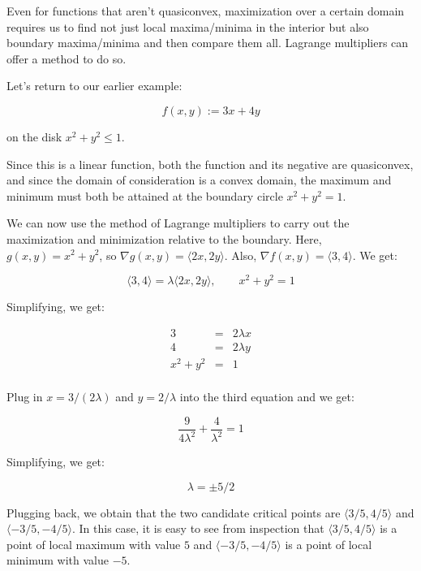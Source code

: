 \documentclass[10pt]{amsart}
\begin{document}
Even for functions that aren't quasiconvex, maximization over a
certain domain requires us to find not just local maxima/minima in the
interior but also boundary maxima/minima and then compare them
all. Lagrange multipliers can offer a method to do so.

Let's return to our earlier example:

$$f(x,y) := 3x + 4y$$

on the disk $x^2 + y^2 \le 1$.

Since this is a linear function, both the function and its negative
are quasiconvex, and since the domain of consideration is a convex
domain, the maximum and minimum must both be attained at the boundary
circle $x^2 + y^2 = 1$.

We can now use the method of Lagrange multipliers to carry out the
maximization and minimization relative to the boundary. Here, $g(x,y)
= x^2 + y^2$, so $\nabla g(x,y) = \langle 2x,2y \rangle$. Also,
$\nabla f(x,y) = \langle 3,4 \rangle$. We get:

$$\langle 3,4 \rangle = \lambda \langle 2x, 2y \rangle, \qquad x^2 + y^2 = 1$$

Simplifying, we get:

\begin{eqnarray*}
  3 & = & 2\lambda x\\
  4 & = & 2\lambda y\\
  x^2 + y^2 & = & 1 \\
\end{eqnarray*}

Plug in $x = 3/(2\lambda)$ and $y = 2/\lambda$ into the third equation
and we get:

$$\frac{9}{4\lambda^2} + \frac{4}{\lambda^2} = 1$$

Simplifying, we get:

$$\lambda = \pm 5/2$$

Plugging back, we obtain that the two candidate critical points are
$\langle 3/5,4/5 \rangle$ and $\langle -3/5,-4/5 \rangle$. In this
case, it is easy to see from inspection that $\langle 3/5,4/5 \rangle$
is a point of local maximum with value $5$ and $\langle -3/5,-4/5
\rangle$ is a point of local minimum with value $-5$.
\end{document}
